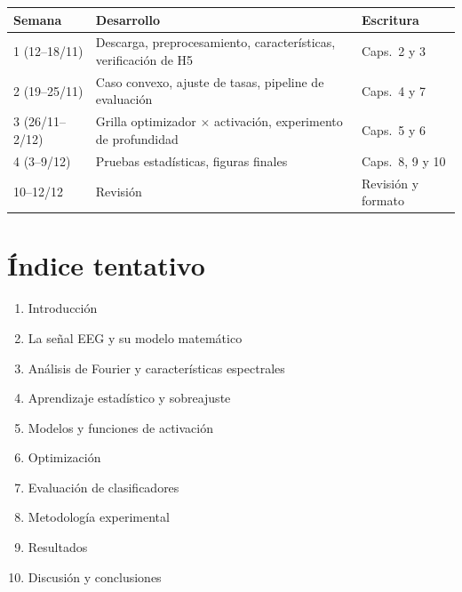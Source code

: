 \documentclass[11pt]{article}
\begin{document}
\begin{tabularx}{\linewidth}{@{}lXX@{}}
\toprule
Semana & Desarrollo & Escritura \\
\midrule
1 (12--18/11) & Descarga, preprocesamiento, características, verificación de H5 & Caps.~2 y 3 \\
2 (19--25/11) & Caso convexo, ajuste de tasas, pipeline de evaluación & Caps.~4 y 7 \\
3 (26/11--2/12) & Grilla optimizador $\times$ activación, experimento de profundidad & Caps.~5 y 6 \\
4 (3--9/12) & Pruebas estadísticas, figuras finales & Caps.~8, 9 y 10 \\
10--12/12 & Revisión & Revisión y formato \\
\bottomrule
\end{tabularx}

\section{Índice tentativo}

\begin{enumerate}
  \item Introducción
  \item La señal EEG y su modelo matemático
  \item Análisis de Fourier y características espectrales
  \item Aprendizaje estadístico y sobreajuste
  \item Modelos y funciones de activación
  \item Optimización
  \item Evaluación de clasificadores
  \item Metodología experimental
  \item Resultados
  \item Discusión y conclusiones
\end{enumerate}

\nocite{bishop2024,goodfellow2016,duda2001,buduma2022}
\printbibliography[title={Bibliografía}]
\end{document}
